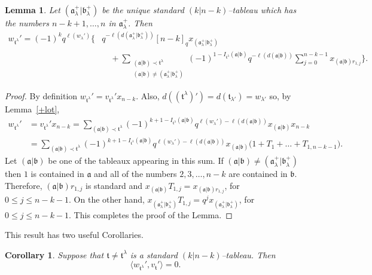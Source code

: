 \documentclass[twoside]{amsart}
\numberwithin{equation}{section}
\newtheorem{Lemma}[equation]{Lemma}
\newtheorem{Corollary}[equation]{Corollary}
\theoremstyle{remark}
\let\>\rangle
\let\<\langle
\def\len(#1){\ell(#1)}
\def\a{\mathfrak a}
\def\b{\mathfrak b}
\def\t{\mathfrak t}
\begin{document}
\begin{Lemma}Let $(\a_\lambda^+|\b_\lambda^+)$ be the unique standard
$(k|n-k)$--tableau which has the numbers $n-k+1,\dots,n$ in
$\a_\lambda^+$. Then
\begin{align*} w_{\t^\lambda}'
=(-1)^kq^{\len(w_{\lambda'})}\Big\{&
        q^{-\len(d(\a_\lambda^+|\b_\lambda^+))}[n-k]_q 
             x_{(\a_\lambda^+|\b_\lambda^+)}\\
  &\quad +\sum_{\substack{(\a|\b)\prec\t^\lambda\\
                         (\a|\b)\ne(\a_\lambda^+|\b_\lambda^+)}}
        (-1)^{1-I_{\t^\lambda}(\a|\b)}q^{-\len(d(\a|\b))}
        \sum_{j=0}^{n-k-1}x_{(\a|\b)r_{1,j}}\Big\}.
\end{align*}
\label{w_t}\end{Lemma}

\begin{proof}
By definition $w_{\t^\lambda}'=v_{\t^\lambda}'x_{n-k}$. Also,
$d((\t^\lambda)')=d(\t_{\lambda'})=w_{\lambda'}$ so, by 
Lemma~\ref{+lot},
\begin{align*}w_{\t^\lambda}'
 &=v_{\t^\lambda}'x_{n-k}=\sum_{(\a|\b)\prec\t^\lambda}
               (-1)^{k+1-I_{\t^\lambda}(\a|\b)}
               q^{\len(w_{\lambda'})-\len(d(\a|\b))}x_{(\a|\b)}x_{n-k}\\
 &=\sum_{(\a|\b)\prec\t^\lambda}
    (-1)^{k+1-I_{\t^\lambda}(\a|\b)}q^{\len(w_{\lambda'})-\len(d(\a|\b))}
        x_{(\a|\b)}\Big(1+T_1+\dots+T_{1,n-k-1}\Big).
\end{align*}
Let $(\a|\b)$ be one of the tableaux appearing in this sum. If
$(\a|\b)\ne(\a_\lambda^+|\b_\lambda^+)$ then $1$ is contained in $\a$
and all of the numbers $2,3,\dots,n-k$ are contained in $\b$.
Therefore, $(\a|\b)r_{1,j}$ is standard and
$x_{(\a|\b)}T_{1,j}=x_{(\a|\b)r_{1,j}}$, for $0\le j\le n-k-1$. On the
other hand,
$x_{(\a_\lambda^+|\b_\lambda^+)}T_{1,j}=q^jx_{(\a_\lambda^+|\b_\lambda^+)}$,
for $0\le j\le n-k-1$.  This completes the proof of the Lemma.
\end{proof}

This result has two useful Corollaries.

\begin{Corollary}\label{zeros}
Suppose that $\t\ne\t^\lambda$ is a standard $(k|n-k)$--tableau. Then
$$\<w_{\t^\lambda}',v_\t'\>=0.$$
\end{Corollary}
\end{document}
